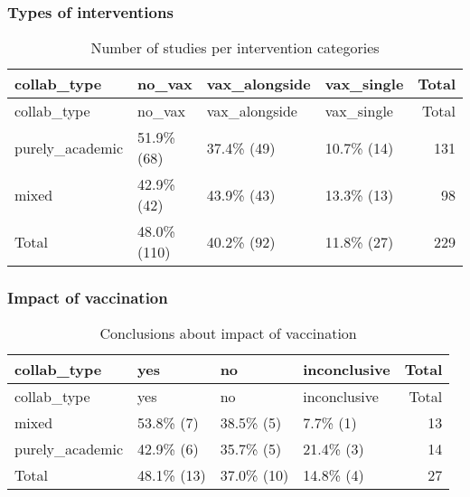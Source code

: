 \documentclass[
]{article}
\begin{document}
\hypertarget{types-of-interventions}{%
\subsubsection{Types of interventions}\label{types-of-interventions}}

\begin{longtable}[]{@{}llllr@{}}
\caption{Number of studies per intervention categories}\tabularnewline
\toprule
collab\_type & no\_vax & vax\_alongside & vax\_single & Total \\
\midrule
\endfirsthead
\toprule
collab\_type & no\_vax & vax\_alongside & vax\_single & Total \\
\midrule
\endhead
purely\_academic & 51.9\% (68) & 37.4\% (49) & 10.7\% (14) & 131 \\
mixed & 42.9\% (42) & 43.9\% (43) & 13.3\% (13) & 98 \\
Total & 48.0\% (110) & 40.2\% (92) & 11.8\% (27) & 229 \\
\bottomrule
\end{longtable}

\hypertarget{impact-of-vaccination}{%
\subsubsection{Impact of vaccination}\label{impact-of-vaccination}}

\begin{longtable}[]{@{}llllr@{}}
\caption{Conclusions about impact of vaccination}\tabularnewline
\toprule
collab\_type & yes & no & inconclusive & Total \\
\midrule
\endfirsthead
\toprule
collab\_type & yes & no & inconclusive & Total \\
\midrule
\endhead
mixed & 53.8\% (7) & 38.5\% (5) & 7.7\% (1) & 13 \\
purely\_academic & 42.9\% (6) & 35.7\% (5) & 21.4\% (3) & 14 \\
Total & 48.1\% (13) & 37.0\% (10) & 14.8\% (4) & 27 \\
\bottomrule
\end{longtable}
\end{document}
